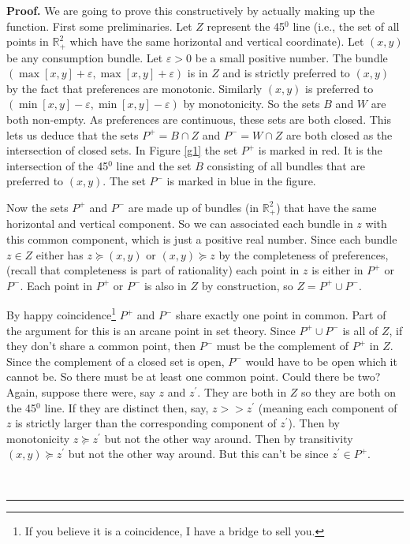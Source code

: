 \documentclass[12pt]{article}
\newenvironment{proof}[1][Proof]{\textbf{#1.} }{\ \rule{0.5em}{0.5em}}
\begin{document}
\begin{proof}
We are going to prove this constructively by actually making up the function.
First some preliminaries. Let $Z$ represent the 45$^{0}$ line (i.e., the set
of all points in $\mathbb{R}_{+}^{2}$ which have the same horizontal and
vertical coordinate). Let $\left(  x,y\right)  $ be any consumption bundle.
Let $\varepsilon>0$ be a small positive number. The bundle $\left(
\max\left[  x,y\right]  +\varepsilon,\max\left[  x,y\right]  +\varepsilon
\right)  $ is in $Z$ and is strictly preferred to $\left(  x,y\right)  $ by
the fact that preferences are monotonic. Similarly $\left(  x,y\right)  $ is
preferred to $\left(  \min\left[  x,y\right]  -\varepsilon,\min\left[
x,y\right]  -\varepsilon\right)  $ by monotonicity. So the sets $B$ and $W$
are both non-empty. As preferences are continuous, these sets are both closed.
This lets us deduce that the sets $P^{+}=B\cap Z$ and $P^{-}=W\cap Z$ are both
closed as the intersection of closed sets. In Figure \ref{g1} the set $P^{+}$
is marked in red. It is the intersection of the 45$^{0}$ line and the set $B$
consisting of all bundles that are preferred to $\left(  x,y\right)  $. The
set $P^{-}$ is marked in blue in the figure.

Now the sets $P^{+}$ and $P^{-}$ are made up of bundles (in $\mathbb{R}%
_{+}^{2}$) that have the same horizontal and vertical component. So we can
associated each bundle in $z$ with this common component, which is just a
positive real number. Since each bundle $z\in Z$ either has $z\succeq\left(
x,y\right)  $ or $\left(  x,y\right)  \succeq z$ by the completeness of
preferences, (recall that completeness is part of rationality) each point in
$z$ is either in $P^{+}$ or $P^{-}$. Each point in $P^{+}$ or $P^{-}$ is also
in $Z$ by construction, so $Z=P^{+}\cup P^{-}$.

By happy coincidence\footnote{If you believe it is a coincidence, I have a
bridge to sell you.} $P^{+}$ and $P^{-}$ share exactly one point in common.
Part of the argument for this is an arcane point in set theory. Since
$P^{+}\cup P^{-}$ is all of $Z$, if they don't share a common point, then
$P^{-}$ must be the complement of $P^{+}$ in $Z$. Since the complement of a
closed set is open, $P^{-}$ would have to be open which it cannot be. So there
must be at least one common point. Could there be two? Again, suppose there
were, say $z$ and $z^{\prime}$. They are both in $Z$ so they are both on the
45$^{0}$ line. If they are distinct then, say, $z>>z^{\prime}$ (meaning each
component of $z$ is strictly larger than the corresponding component of
$z^{\prime}$). Then by monotonicity $z\succeq z^{\prime}$ but not the other
way around. Then by transitivity $\left(  x,y\right)  \succeq z^{\prime}$ but
not the other way around. But this can't be since $z^{\prime}\in P^{+}$.


\end{proof}
\end{document}
